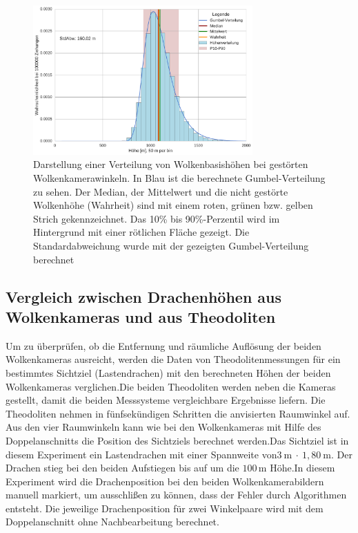 \documentclass[a4paper,11pt,twoside,german]{article}
\newcommand{\absatz}{\smallbreak}
\begin{document}
\begin{figure}[t]
	\begin{center}
		\includegraphics[width=0.75\textwidth]{media/sens_prob_height.pdf}
		\caption[Wolkenhöhenverteilung von gestörten Wolkenkamerawinkeln]{Darstellung einer Verteilung von Wolkenbasishöhen bei gestörten Wolkenkamerawinkeln. In Blau ist die berechnete Gumbel-Verteilung zu sehen. Der Median, der Mittelwert und die nicht gestörte Wolkenhöhe (Wahrheit) sind mit einem roten, grünen bzw. gelben Strich gekennzeichnet. Das 10\% bis 90\%-Perzentil wird im Hintergrund mit einer rötlichen Fläche gezeigt. Die Standardabweichung wurde mit der gezeigten Gumbel-Verteilung berechnet}
		\label{FIGSens}
	\end{center}
\end{figure}

\subsection{Vergleich zwischen Drachenhöhen aus Wolkenkameras und aus Theodoliten}
\label{SECDragon}
Um zu überprüfen, ob die Entfernung und räumliche Auflösung der beiden
Wolkenkameras ausreicht, werden die Daten von Theodolitenmessungen für ein
bestimmtes Sichtziel (Lastendrachen) mit den berechneten Höhen der beiden
Wolkenkameras verglichen.\absatz Die beiden Theodoliten werden neben die Kameras
gestellt, damit die beiden Messsysteme vergleichbare Ergebnisse liefern. Die
Theodoliten nehmen in fünfsekündigen Schritten die anvisierten Raumwinkel auf.
Aus den vier Raumwinkeln kann wie bei den Wolkenkameras mit Hilfe des
Doppelanschnitts die Position des Sichtziels berechnet werden.\absatz Das
Sichtziel ist in diesem Experiment ein Lastendrachen mit einer Spannweite
von\linebreak[4]$3~\text{m}~\cdot~1,80~\text{m}$. Der Drachen stieg bei den beiden
Aufstiegen bis auf um die $100\,\mathrm{m}$ Höhe.\absatz In diesem Experiment
wird die Drachenposition bei den beiden Wolkenkamerabildern manuell markiert, um
ausschlißen zu können, dass der Fehler durch Algorithmen entsteht. Die jeweilige
Drachenposition für zwei Winkelpaare wird mit dem Doppelanschnitt ohne
Nachbearbeitung berechnet.\absatz
\end{document}
